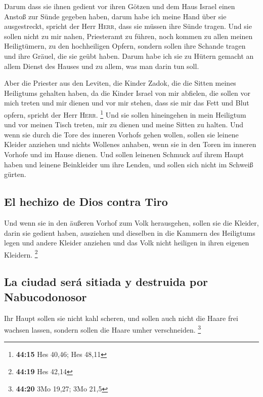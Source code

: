  Darum dass sie ihnen gedient vor ihren Götzen und dem
Haus Israel einen Anstoß zur Sünde gegeben haben, darum habe ich meine
Hand über sie ausgestreckt, spricht der Herr \textsc{Herr}, dass sie
müssen ihre Sünde tragen.  Und sie sollen nicht zu mir
nahen, Priesteramt zu führen, noch kommen zu allen meinen Heiligtümern,
zu den hochheiligen Opfern, sondern sollen ihre Schande tragen und ihre
Gräuel, die sie geübt haben.  Darum habe ich sie zu
Hütern gemacht an allem Dienst des Hauses und zu allem, was man darin
tun soll.

 Aber die Priester aus den Leviten, die Kinder Zadok, die
die Sitten meines Heiligtums gehalten haben, da die Kinder Israel von
mir abfielen, die sollen vor mich treten und mir dienen und vor mir
stehen, dass sie mir das Fett und Blut opfern, spricht der Herr
\textsc{Herr}. \footnote{\textbf{44:15} Hes 40,46; Hes 48,11}
 Und sie sollen hineingehen in mein Heiligtum und vor
meinen Tisch treten, mir zu dienen und meine Sitten zu halten.
 Und wenn sie durch die Tore des inneren Vorhofs gehen
wollen, sollen sie leinene Kleider anziehen und nichts Wollenes anhaben,
wenn sie in den Toren im inneren Vorhofe und im Hause dienen.
 Und sollen leinenen Schmuck auf ihrem Haupt haben und
leinene Beinkleider um ihre Lenden, und sollen sich nicht im Schweiß
gürten.

\hypertarget{el-hechizo-de-dios-contra-tiro}{%
\subsection{El hechizo de Dios contra
Tiro}\label{el-hechizo-de-dios-contra-tiro}}

 Und wenn sie in den äußeren Vorhof zum Volk herausgehen,
sollen sie die Kleider, darin sie gedient haben, ausziehen und dieselben
in die Kammern des Heiligtums legen und andere Kleider anziehen und das
Volk nicht heiligen in ihren eigenen Kleidern. \footnote{\textbf{44:19}
  Hes 42,14}

\hypertarget{la-ciudad-seruxe1-sitiada-y-destruida-por-nabucodonosor}{%
\subsection{La ciudad será sitiada y destruida por
Nabucodonosor}\label{la-ciudad-seruxe1-sitiada-y-destruida-por-nabucodonosor}}

 Ihr Haupt sollen sie nicht kahl scheren, und sollen auch
nicht die Haare frei wachsen lassen, sondern sollen die Haare umher
verschneiden. \footnote{\textbf{44:20} 3Mo 19,27; 3Mo 21,5}

